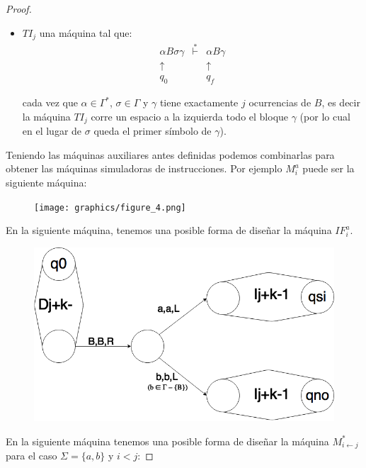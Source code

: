 \begin{proof}
\begin{itemize}
      \pagebreak
      \item $TI_{j}$ una máquina tal que:
    		\[
          \begin{array}{ccc}
            \alpha B \sigma \gamma &\overset{\ast}{\vdash}& \alpha B \gamma \\
            \uparrow \ && \uparrow \\
            q_{0} \ \ && q_{f}
          \end{array}
    	  \]

        \PN cada vez que $\alpha \in \Gamma ^{\ast }$, $\sigma \in \Gamma $ y $\gamma $ tiene exactamente $j$
        ocurrencias de $B$, es decir la máquina $TI_{j}$ corre un espacio a la izquierda todo el bloque $\gamma $ (por
        lo cual en el lugar de $\sigma $ queda el primer símbolo de $\gamma $).
    \end{itemize}

    \vspace{5mm}
    \PN Teniendo las máquinas auxiliares antes definidas podemos combinarlas para obtener las máquinas simuladoras de
    instrucciones. Por ejemplo $M_{i}^{a}$ puede ser la siguiente máquina:

    \begin{figure}[h]
      \centering
      \texttt{[image: graphics/figure\_4.png]}
    \end{figure}

    \PN En la siguiente máquina, tenemos una posible forma de diseñar la máquina $IF_{i}^{a}$.

    \begin{figure}[h]
      \centering
      \includegraphics[scale=0.33]{graphics/figure_2.png}
    \end{figure}

    \pagebreak
    \PN En la siguiente máquina tenemos una posible forma de diseñar la máquina $M_{i\leftarrow j}^{\ast}$ para el caso
    $\Sigma = \{a,b\}$ y $i < j$:


\end{proof}
